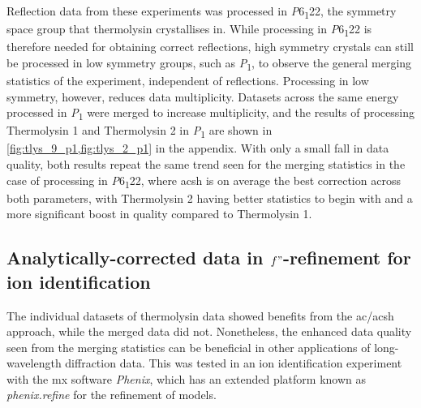 Reflection data from these experiments was processed in \textit{P}6\textsubscript{1}22, the symmetry space group that thermolysin crystallises in. While processing in \textit{P}6\textsubscript{1}22 is therefore needed for obtaining correct reflections, high symmetry crystals can still be processed in low symmetry groups, such as \textit{P}\textsubscript{1}, to observe the general merging statistics of the experiment, independent of reflections.
Processing in low symmetry, however, reduces data multiplicity. Datasets across the same energy processed in \textit{P}\textsubscript{1} were merged to increase multiplicity, and the results of processing Thermolysin 1 and Thermolysin 2 in \textit{P}\textsubscript{1} are shown in \cref{fig:tlys_9_p1,fig:tlys_2_p1} in the appendix. With only a small fall in data quality, both results repeat the same trend seen for the merging statistics in the case of processing in \textit{P}6\textsubscript{1}22, where \ac{acsh} is on average the best correction across both parameters, with Thermolysin 2 having better statistics to begin with and a more significant boost in quality compared to Thermolysin 1.

\subsection{Analytically-corrected data in $f"$-refinement for ion identification}


The individual datasets of thermolysin data showed benefits from the \ac{ac}/\ac{acsh} approach, while the merged data did not. Nonetheless, the enhanced data quality seen from the merging statistics can be beneficial in other applications of long-wavelength diffraction data. This was tested in an ion identification experiment with the \ac{mx} software \textit{Phenix}, which has an extended platform known as \textit{phenix.refine} for the refinement of models.%

